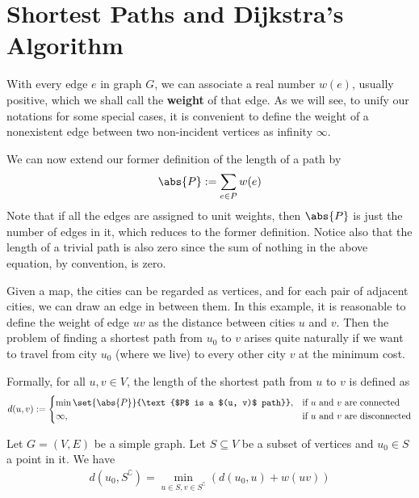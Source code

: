 \documentclass[thmcnt=section, 12pt, color=cyan]{my-elegantbook}
\begin{document}

\section{Shortest Paths and Dijkstra's Algorithm}

With every edge $e$ in graph $G$, we can associate a real number $w(e)$, usually positive, which we shall call the \textbf{weight} of that edge. As we will see, to unify our notations for some special cases, it is convenient to define the weight of a nonexistent edge between two non-incident vertices as infinity $\infty$. 

We can now extend our former definition of the length of a path by 
\begin{align*}
    \abs{P} := \sum_{e \in P} w(e)
\end{align*}
Note that if all the edges are assigned to unit weights, then $\abs{P}$ is just the number of edges in it, which reduces to the former definition. Notice also that the length of a trivial path is also zero since the sum of nothing in the above equation, by convention, is zero.

Given a map, the cities can be regarded as vertices, and for each pair of adjacent cities, we can draw an edge in between them. In this example, it is reasonable to define the weight of edge $uv$ as the distance between cities $u$ and $v$. Then the problem of finding a shortest path from $u_0$ to $v$ arises quite naturally if we want to travel from city $u_0$ (where we live) to every other city $v$ at the minimum cost.

Formally, for all $u, v \in V$, the length of the shortest path from $u$ to $v$ is defined as 
\begin{align*}
    d(u,v) := 
    \begin{cases}
        \min \set{\abs{P}}{\text{$P$ is a $(u, v)$ path}} ,
        &\text{if $u$ and $v$ are connected} \\ 
        \infty,
        &\text{if $u$ and $v$ are disconnected}
    \end{cases}
\end{align*}

\begin{proposition} \label{pro:2}
    Let $G = (V, E)$ be a simple graph. Let $S \subseteq V$ be a subset of vertices and $u_0 \in S$ a point in it. We have 
    \begin{align}
        d(u_0, S^\complement)
        = \min_{u \in S, v \in S^\complement} (
            d(u_0, u) + w(u v)
        )
        \label{eq:5}
    \end{align}
\end{proposition}
\end{document}
